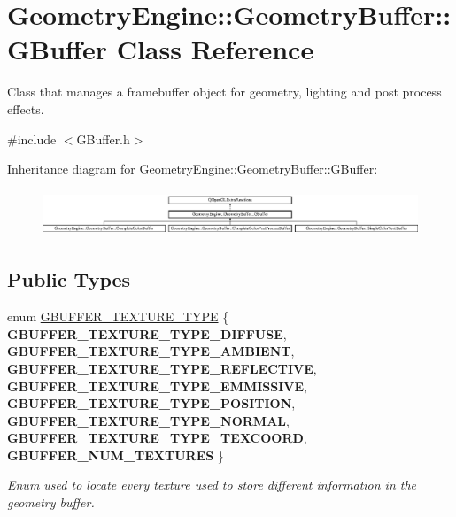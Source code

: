 \hypertarget{class_geometry_engine_1_1_geometry_buffer_1_1_g_buffer}{}\section{Geometry\+Engine\+::Geometry\+Buffer\+::G\+Buffer Class Reference}
\label{class_geometry_engine_1_1_geometry_buffer_1_1_g_buffer}


Class that manages a framebuffer object for geometry, lighting and post process effects.  




{\ttfamily \#include $<$G\+Buffer.\+h$>$}

Inheritance diagram for Geometry\+Engine\+::Geometry\+Buffer\+::G\+Buffer\+:\begin{figure}[H]
\begin{center}
\leavevmode
\includegraphics[height=1.393035cm]{class_geometry_engine_1_1_geometry_buffer_1_1_g_buffer}
\end{center}
\end{figure}
\subsection*{Public Types}
\begin{DoxyCompactItemize}
\item 
\mbox{\label{class_geometry_engine_1_1_geometry_buffer_1_1_g_buffer_a718dceafcac1915f7de061108597e1cc}} 
enum \mbox{\hyperlink{class_geometry_engine_1_1_geometry_buffer_1_1_g_buffer_a718dceafcac1915f7de061108597e1cc}{G\+B\+U\+F\+F\+E\+R\+\_\+\+T\+E\+X\+T\+U\+R\+E\+\_\+\+T\+Y\+PE}} \{ \newline
{\bfseries G\+B\+U\+F\+F\+E\+R\+\_\+\+T\+E\+X\+T\+U\+R\+E\+\_\+\+T\+Y\+P\+E\+\_\+\+D\+I\+F\+F\+U\+SE}, 
{\bfseries G\+B\+U\+F\+F\+E\+R\+\_\+\+T\+E\+X\+T\+U\+R\+E\+\_\+\+T\+Y\+P\+E\+\_\+\+A\+M\+B\+I\+E\+NT}, 
{\bfseries G\+B\+U\+F\+F\+E\+R\+\_\+\+T\+E\+X\+T\+U\+R\+E\+\_\+\+T\+Y\+P\+E\+\_\+\+R\+E\+F\+L\+E\+C\+T\+I\+VE}, 
{\bfseries G\+B\+U\+F\+F\+E\+R\+\_\+\+T\+E\+X\+T\+U\+R\+E\+\_\+\+T\+Y\+P\+E\+\_\+\+E\+M\+M\+I\+S\+S\+I\+VE}, 
\newline
{\bfseries G\+B\+U\+F\+F\+E\+R\+\_\+\+T\+E\+X\+T\+U\+R\+E\+\_\+\+T\+Y\+P\+E\+\_\+\+P\+O\+S\+I\+T\+I\+ON}, 
{\bfseries G\+B\+U\+F\+F\+E\+R\+\_\+\+T\+E\+X\+T\+U\+R\+E\+\_\+\+T\+Y\+P\+E\+\_\+\+N\+O\+R\+M\+AL}, 
{\bfseries G\+B\+U\+F\+F\+E\+R\+\_\+\+T\+E\+X\+T\+U\+R\+E\+\_\+\+T\+Y\+P\+E\+\_\+\+T\+E\+X\+C\+O\+O\+RD}, 
{\bfseries G\+B\+U\+F\+F\+E\+R\+\_\+\+N\+U\+M\+\_\+\+T\+E\+X\+T\+U\+R\+ES}
 \}
\begin{DoxyCompactList}\small\item\em Enum used to locate every texture used to store different information in the geometry buffer. \end{DoxyCompactList}\end{DoxyCompactItemize}
